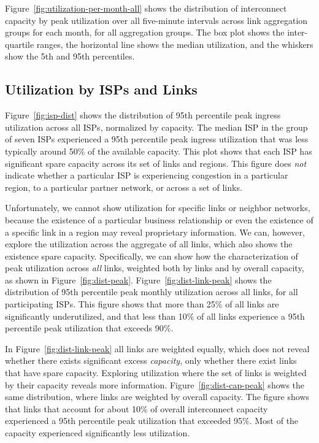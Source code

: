 
Figure~\ref{fig:utilization-per-month-all} shows the distribution of
interconnect capacity by peak utilization over all five-minute intervals across link
aggregation groups for each month, for all aggregation groups. The box
plot shows the inter-quartile ranges, the horizontal line shows the
median utilization, and the whiskers show the 5th and 95th
percentiles. 

\subsection{Utilization by ISPs and Links}

Figure~\ref{fig:isp-dist} shows the distribution of 95th percentile peak ingress
utilization across all ISPs, normalized by capacity. The median ISP in
the group of seven ISPs experienced a 95th percentile peak ingress
utilization that was less typically around 50\% of the available
capacity.  This plot shows that each ISP has significant spare capacity
across its set of links and regions.  This figure does {\em not} indicate
whether a particular ISP is experiencing congestion in a particular
region, to a particular partner network, or across a set of links.

Unfortunately, we cannot show utilization for specific links or neighbor
networks, because the existence of a particular business relationship or
even the existence of a specific link in a region may reveal proprietary
information. We can, however, explore the utilization across the
aggregate of all links, which also shows the existence spare capacity.
Specifically, we can show how the characterization of peak utilization
across {\em all} links, weighted both by links and by overall capacity,
as shown in Figure~\ref{fig:dist-peak}.  Figure~\ref{fig:dist-link-peak}
shows the distribution of 95th percentile peak monthly utilization
across all links, for all participating ISPs.  This figure shows that
more than 25\% of all links are significantly underutilized, and that
less than 10\% of all links experience a 95th percentile peak
utilization that exceeds 90\%.  

In Figure~\ref{fig:dist-link-peak} all links are weighted equally, which
does not reveal whether there exists significant excess {\em capacity},
only whether there exist links that have spare capacity. Exploring
utilization where the set of links is weighted by their capacity reveals
more information. Figure~\ref{fig:dist-cap-peak} shows the same
distribution, where links are weighted by overall capacity. The figure
shows that links that account for about 10\% of overall interconnect
capacity experienced a 95th percentile peak utilization that exceeded
95\%.  Most of the capacity experienced significantly less utilization.


